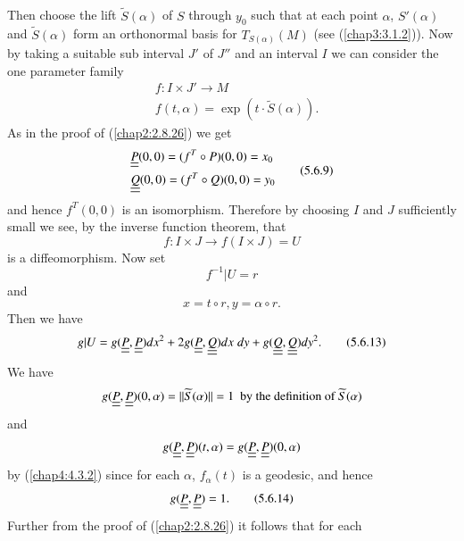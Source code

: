 \subsection{}\label{chap5:5.6.7}
Then choose the lift $\widetilde{S}(\alpha)$ of $S$ through $y_{0}$
such that at each point $\alpha$, $S'(\alpha)$ and
$\widetilde{S}(\alpha)$ form an orthonormal basis for
$T_{S(\alpha)}(M)$ (see (\ref{chap3:3.1.2})). Now by taking a suitable
sub interval $J'$ of $J''$ and an interval $I$ we can consider the one
parameter family 
\begin{align*}
& f:I\times J'\to M\tag{5.6.8}\label{chap5:5.6.8}\\
& f(t,\alpha)=\exp(t\cdot \widetilde{S}(\alpha)).
\end{align*}
As in the proof of (\ref{chap2:2.8.26}) we get
\begin{equation*}
\begin{split}
& \underline{\underline{P}}(0,0)=(f^{T}\circ P)(0,0)=x_{0}\\
&\underline{\underline{Q}}(0,0)=(f^{T}\circ Q)(0,0)=y_{0}
\end{split}\tag{5.6.9}\label{chap5:5.6.9}
\end{equation*}
and hence $f^{T}(0,0)$ is an isomorphism. Therefore by choosing $I$
and $J$ sufficiently small we see, by the inverse function theorem,
that 
\begin{equation*}
f:I\times J\to f(I\times J)=U\tag{5.6.10}\label{chap5:5.6.10}
\end{equation*}\pageoriginale
is a diffeomorphism. Now set
\begin{equation*}
f^{-1}|U=r\tag{5.6.11}\label{chap5:5.6.11}
\end{equation*}
and
\begin{equation*}
x=t\circ r, y=\alpha\circ r.\tag{5.6.12}\label{chap5:5.6.12}
\end{equation*}
Then we have
\begin{equation*}
g|U=g(\underline{\underline{P}},\underline{\underline{P}})dx^{2}+2g(\underline{\underline{P}},\underline{\underline{Q}})dx\;
dy+g(\underline{\underline{Q}},\underline{\underline{Q}})dy^{2}.\tag{5.6.13}\label{chap5:5.6.13}
\end{equation*}
We have
$$
g(\underline{\underline{P}},\underline{\underline{P}})(0,\alpha)=||\widetilde{S}(\alpha)||=1\text{ \ by
  the definition of }\widetilde{S}(\alpha)
$$
and 
$$
g(\underline{\underline{P}},\underline{\underline{P}})(t,\alpha)=g(\underline{\underline{P}},\underline{\underline{P}})(0,\alpha)
$$
by (\ref{chap4:4.3.2}) since for each $\alpha$, $f_{\alpha}(t)$ is a
geodesic, and hence
\begin{equation*}
g(\underline{\underline{P}},\underline{\underline{P}})=1.\tag{5.6.14}\label{chap5:5.6.14}
\end{equation*}
Further from the proof of (\ref{chap2:2.8.26}) it follows that for each
